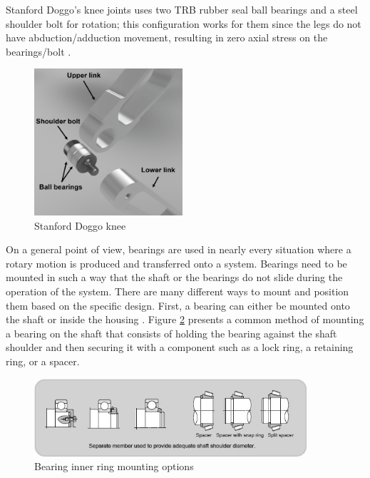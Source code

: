 Stanford Doggo's knee joints uses two TRB rubber seal ball bearings and a steel shoulder bolt for rotation; this configuration works for them since the legs do not have abduction/adduction movement, resulting in zero axial stress on the bearings/bolt \cite{kau_nate711/stanforddoggoproject_2019}.

\begin{figure}[H]
    \centering
    \includegraphics[width=0.49\textwidth]{Sections/LiteratureReview/img/doggo/subsys_doggo_knee.png}
    \caption{Stanford Doggo knee \cite{kau_nate711/stanforddoggoproject_2019}}
    \label{fig:doggo_knee}
\end{figure}

On a general point of view, bearings are used in nearly every situation where a rotary motion is produced and transferred onto a system. Bearings need to be mounted in such a way that the shaft or the bearings do not slide during the operation of the system. There are many different ways to mount and position them based on the specific design. First, a bearing can either be mounted onto the shaft or inside the housing \cite{hch_bearing_mounting_2013}. Figure \ref{fig:bearing_inner} presents a common method of mounting a bearing on the shaft that consists of holding the bearing against the shaft shoulder and then securing it with a component such as a lock ring, a retaining ring, or a spacer.

\begin{figure}[H]
    \centering
    \includegraphics[width=0.9\textwidth]{Sections/LiteratureReview/img/Bearings/bearings_inner_set.jpg}
    \caption{Bearing inner ring mounting options \cite{hch_bearing_mounting_2013}}
    \label{fig:bearing_inner}
\end{figure}

